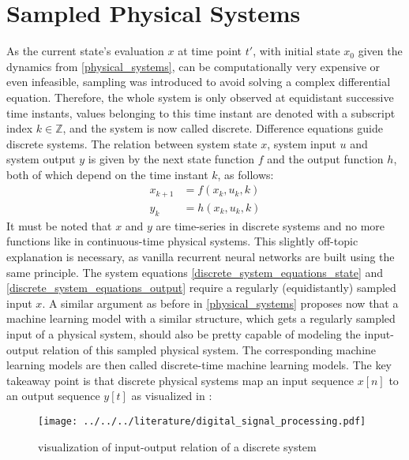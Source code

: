 \documentclass[draft,final]{vutinfth} %
\begin{document}
    \section{Sampled Physical Systems} \label{sampled_physical_systems}
    As the current state's evaluation $x$ at time point $t'$, with initial state $x_0$ given the dynamics from \ref{physical_systems}, can be computationally very expensive or even infeasible, sampling was introduced to avoid solving a complex differential equation.
    Therefore, the whole system is only observed at equidistant successive time instants, values belonging to this time instant are denoted with a subscript index $k \in \mathbb{Z}$, and the system is now called discrete.
    Difference equations guide discrete systems. The relation between system state $x$, system input $u$ and system output $y$ is given by the next state function $f$ and the output function $h$, both of which depend on the time instant $k$, as follows:
    \begin{align}
        \label{discrete_system_equations_state}
        x_{k+1} &= f(x_k,u_k,k) \\
        \label{discrete_system_equations_output}
        y_k &= h(x_k,u_k,k)
    \end{align}
    It must be noted that $x$ and $y$ are time-series in discrete systems and no more functions like in continuous-time physical systems.
    This slightly off-topic explanation is necessary, as vanilla recurrent neural networks are built using the same principle.
    The system equations \ref{discrete_system_equations_state} and \ref{discrete_system_equations_output} require a regularly (equidistantly) sampled input $x$.
    A similar argument as before in \ref{physical_systems} proposes now that a machine learning model with a similar structure, which gets a regularly sampled input of a physical system, should also be pretty capable of modeling the input-output relation of this sampled physical system.
    The corresponding machine learning models are then called discrete-time machine learning models.
    The key takeaway point is that discrete physical systems map an input sequence $x[n]$ to an output sequence $y[t]$ as visualized in \cite[p. 102]{dsp}:
    \begin{figure}[H]
        \centering{}
        \texttt{[image: ../../../literature/digital\_signal\_processing.pdf]}
        \caption{visualization of input-output relation of a discrete system}
        \label{fig:discrete_system_vis}
    \end{figure}
\end{document}
